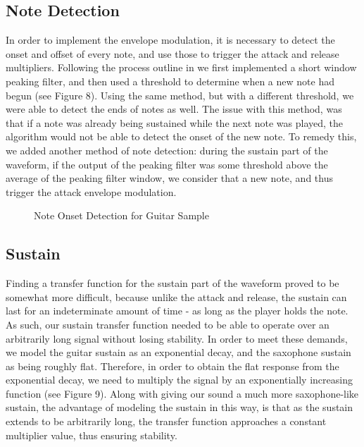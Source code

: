 \documentclass[12pt]{article}
\begin{document}
\subsection{Note Detection}
In order to implement the envelope modulation, it is necessary to detect the onset and offset of every note, and use those to trigger the attack and release multipliers. Following the process outline in \cite{NoteOnset} we first implemented a short window peaking filter, and then used a threshold to determine when a new note had begun (see Figure 8). Using the same method, but with a different threshold, we were able to detect the ends of notes as well. The issue with this method, was that if a note was already being sustained while the next note was played, the algorithm would not be able to detect the onset of the new note. To remedy this, we added another method of note detection: during the sustain part of the waveform, if the output of the peaking filter was some threshold above the average of the peaking filter window, we consider that a new note, and thus trigger the attack envelope modulation.
\setlength{\abovecaptionskip}{5pt}
\begin{figure}[h]
\caption{Note Onset Detection for Guitar Sample}
\centering
\end{figure}

\subsection{Sustain}
Finding a transfer function for the sustain part of the waveform proved to be somewhat more difficult, because unlike the attack and release, the sustain can last for an indeterminate amount of time - as long as the player holds the note. As such, our sustain transfer function needed to be able to operate over an arbitrarily long signal without losing stability. In order to meet these demands, we model the guitar sustain as an exponential decay, and the saxophone sustain as being roughly flat. Therefore, in order to obtain the flat response from the exponential decay, we need to multiply the signal by an exponentially increasing function (see Figure 9). Along with giving our sound a much more saxophone-like sustain, the advantage of modeling the sustain in this way, is that as the sustain extends to be arbitrarily long, the transfer function approaches a constant multiplier value, thus ensuring stability.
\end{document}
